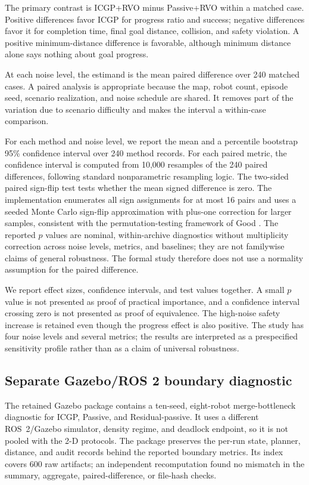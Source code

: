 \documentclass[pdflatex,sn-mathphys-num]{sn-jnl}
\begin{document}
The primary contrast is ICGP+RVO minus Passive+RVO within a matched case. Positive differences favor ICGP for progress ratio and success; negative differences favor it for completion time, final goal distance, collision, and safety violation. A positive minimum-distance difference is favorable, although minimum distance alone says nothing about goal progress.

At each noise level, the estimand is the mean paired difference over 240 matched cases. A paired analysis is appropriate because the map, robot count, episode seed, scenario realization, and noise schedule are shared. It removes part of the variation due to scenario difficulty and makes the interval a within-case comparison.

For each method and noise level, we report the mean and a percentile bootstrap 95\% confidence interval over 240 method records. For each paired metric, the confidence interval is computed from 10,000 resamples of the 240 paired differences, following standard nonparametric resampling logic. The two-sided paired sign-flip test tests whether the mean signed difference is zero. The implementation enumerates all sign assignments for at most 16 pairs and uses a seeded Monte Carlo sign-flip approximation with plus-one correction for larger samples, consistent with the permutation-testing framework of Good \cite{good2005}. The reported $p$ values are nominal, within-archive diagnostics without multiplicity correction across noise levels, metrics, and baselines; they are not familywise claims of general robustness. The formal study therefore does not use a normality assumption for the paired difference.

We report effect sizes, confidence intervals, and test values together. A small $p$ value is not presented as proof of practical importance, and a confidence interval crossing zero is not presented as proof of equivalence. The high-noise safety increase is retained even though the progress effect is also positive. The study has four noise levels and several metrics; the results are interpreted as a prespecified sensitivity profile rather than as a claim of universal robustness.

\subsection{Separate Gazebo/ROS 2 boundary diagnostic}

The retained Gazebo package contains a ten-seed, eight-robot merge-bottleneck diagnostic for ICGP, Passive, and Residual-passive. It uses a different ROS~2/Gazebo simulator, density regime, and deadlock endpoint, so it is not pooled with the 2-D protocols. The package preserves the per-run state, planner, distance, and audit records behind the reported boundary metrics. Its index covers 600 raw artifacts; an independent recomputation found no mismatch in the summary, aggregate, paired-difference, or file-hash checks.
\end{document}
